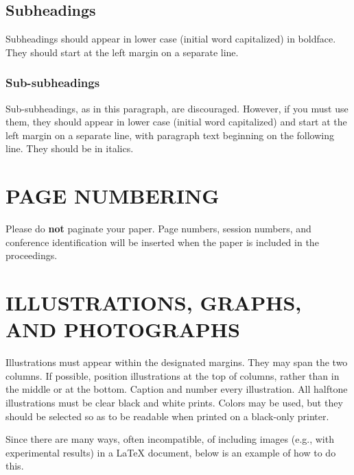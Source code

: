 \documentclass{article}
\begin{document}
\subsection{Subheadings}


Subheadings should appear in lower case (initial word capitalized) in
boldface.  They should start at the left margin on a separate line.
 
\subsubsection{Sub-subheadings}


Sub-subheadings, as in this paragraph, are discouraged. However, if you
must use them, they should appear in lower case (initial word
capitalized) and start at the left margin on a separate line, with paragraph
text beginning on the following line.  They should be in italics.


\section{PAGE NUMBERING}


Please do {\bf not} paginate your paper.  Page numbers, session numbers, and
conference identification will be inserted when the paper is included in the
proceedings.

\section{ILLUSTRATIONS, GRAPHS, AND PHOTOGRAPHS}


Illustrations must appear within the designated margins.  They may span the two
columns.  If possible, position illustrations at the top of columns, rather
than in the middle or at the bottom.  Caption and number every illustration.
All halftone illustrations must be clear black and white prints.  Colors may be
used, but they should be selected so as to be readable when printed on a
black-only printer.

Since there are many ways, often incompatible, of including images (e.g., with
experimental results) in a LaTeX document, below is an example of how to do
this.
\end{document}
